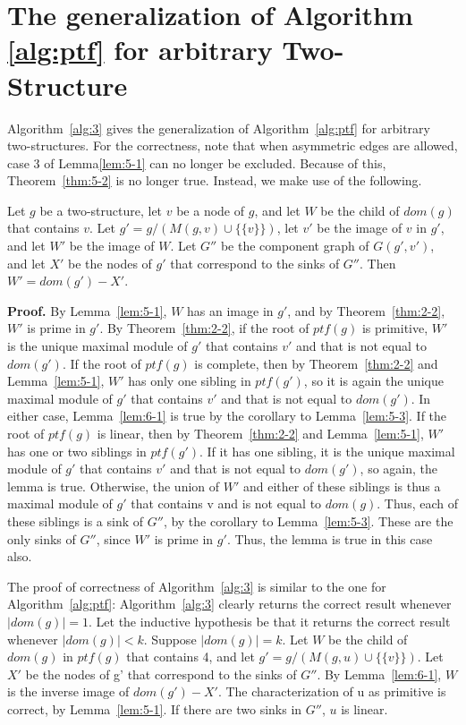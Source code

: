 \section{The generalization of Algorithm \ref{alg:ptf} for arbitrary Two-Structure}\label{sec:the-generalization-of-algorithmref{alg:ptf}-for-arbitrary-two-structure}

Algorithm~\ref{alg:3} gives the generalization of Algorithm~\ref{alg:ptf} for arbitrary two-structures.
For the correctness, note that when asymmetric edges are allowed, case 3 of Lemma\ref{lem:5-1} can no longer be excluded.
Because of this, Theorem~\ref{thm:5-2} is no longer true.
Instead, we make use of the following.

\begin{mylem}
    \label{lem:6-1}
    Let $g$ be a two-structure, let $v$ be a node of $g$, and let $W$ be the child of $dom(g)$ that contains $v$.
    Let $g' = g / (M(g, v) \cup \{\{v\}\})$, let $v'$ be the image of $v$ in $g'$, and let $W'$ be the image of $W$.
    Let $G''$ be the component graph of $G(g', v')$, and let $X'$ be the nodes of $g'$ that correspond to the sinks of $G''$.
    Then $W' = dom(g') - X'$.
\end{mylem}

\textbf{Proof.}
By Lemma~\ref{lem:5-1}, $W$ has an image in $g'$, and by Theorem~\ref{thm:2-2}, $W'$ is prime in $g'$.
By Theorem~\ref{thm:2-2}, if the root of $ptf(g)$ is primitive, $W'$ is the unique maximal module of $g'$ that contains $v'$ and that is not equal to $dom(g')$.
If the root of $ptf(g)$ is complete, then by Theorem~\ref{thm:2-2} and Lemma~\ref{lem:5-1}, $W'$ has only one sibling in $ptf(g')$, so it is again the unique maximal module of $g'$ that contains $v'$ and that is not equal to $dom(g')$.
In either case, Lemma~\ref{lem:6-1} is true by the corollary to Lemma~\ref{lem:5-3}.
If the root of $ptf(g)$ is linear, then by Theorem~\ref{thm:2-2} and Lemma~\ref{lem:5-1}, $ W'$ has one or two siblings in $ptf(g')$.
If it has one sibling, it is the unique maximal module of $g'$ that contains $v'$ and that is not equal to $dom(g')$, so again, the lemma is true.
Otherwise, the union of $W'$ and either of these siblings is thus a maximal module of $g'$ that contains v and is not equal to $dom(g)$.
Thus, each of these siblings is a sink of $G''$, by the corollary to Lemma~\ref{lem:5-3}.
These are the only sinks of $G''$, since $W'$ is prime in $g'$.
Thus, the lemma is true in this case also.


The proof of correctness of Algorithm~\ref{alg:3} is similar to the one for Algorithm~\ref{alg:ptf}: Algorithm~\ref{alg:3} clearly returns the correct result whenever $\mid dom(g) \mid = 1$.
Let the inductive hypothesis be that it returns the correct result whenever $\mid dom(g) \mid < k$.
Suppose $\mid dom(g) \mid = k$.
Let $W$ be the child of $dom(g)$ in $ptf(g)$ that contains 4, and let $g' = g/(M(g, u) \cup \{\{v\}\})$.
Let $X'$ be the nodes of g' that correspond to the sinks of $G''$.
By Lemma~\ref{lem:6-1}, $W$ is the inverse image of $dom(g') - X'$.
The characterization of u as primitive is correct, by Lemma~\ref{lem:5-1}.
If there are two sinks in $G''$, $u$ is linear.

